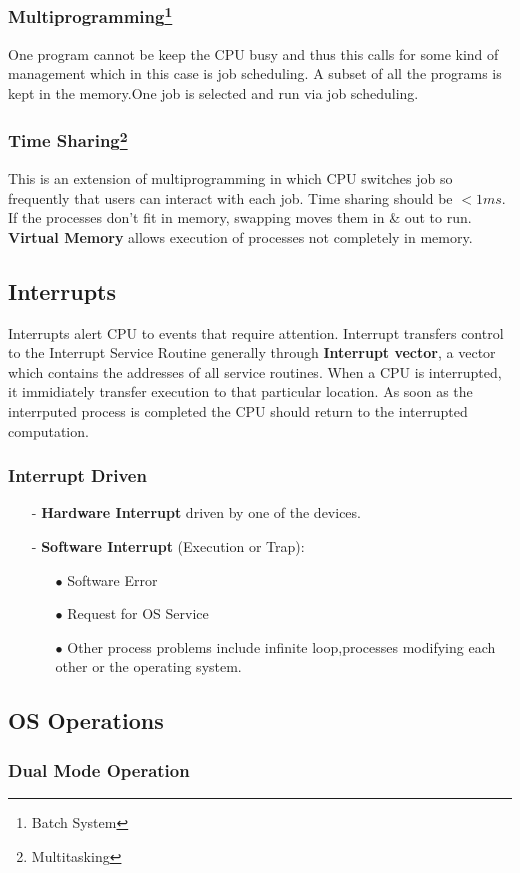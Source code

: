 \documentclass[./OperatingSystems.tex]{subfiles}
\begin{document}
\subsubsection*{Multiprogramming\footnote{Batch System}}
One program cannot be keep the CPU busy and thus this calls for some kind of management which in this case is job scheduling.
A subset of all the programs is kept in the memory.One job is selected and run via job scheduling.

\subsubsection*{Time Sharing\footnote{Multitasking}}
This is an extension of multiprogramming in which CPU switches job so frequently that users can interact with each job. Time sharing should be $< 1ms$.
If the processes don't fit in memory, swapping moves them in \& out to run. \textbf{Virtual Memory} allows execution of processes not completely in memory.

\subsection{Interrupts}

Interrupts alert CPU to events that require attention. Interrupt transfers control to the Interrupt Service Routine generally through 
\textbf{Interrupt vector}, a vector which contains the addresses of all service routines. When a CPU is interrupted, it immidiately transfer execution to that particular location. 
As soon as the interrputed process is completed the CPU should return to the interrupted computation.

\subsubsection*{Interrupt Driven}
\begin{itemize}
\item[-] \textbf{Hardware Interrupt} driven by one of the devices.
\item[-] \textbf{Software Interrupt} (Execution or Trap):
\begin{itemize}
    \item[$\bullet$] Software Error
    \item[$\bullet$] Request for OS Service
    \item[$\bullet$] Other process problems include infinite loop,processes modifying each other or the operating system.
\end{itemize}
\end{itemize}

\subsection{OS Operations}

\subsubsection{Dual Mode Operation}
\end{document}
